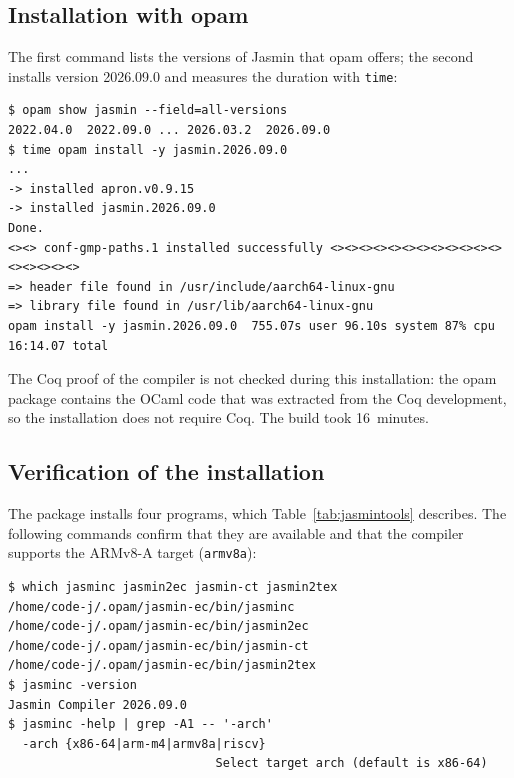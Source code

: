 \documentclass[11pt,a4paper]{article}
\begin{document}
\subsection{Installation with opam}

The first command lists the versions of Jasmin that opam offers; the second
installs version 2026.09.0 and measures the duration with \texttt{time}:

\begin{lstlisting}[style=shell]
$ opam show jasmin --field=all-versions
2022.04.0  2022.09.0 ... 2026.03.2  2026.09.0
$ time opam install -y jasmin.2026.09.0
...
-> installed apron.v0.9.15
-> installed jasmin.2026.09.0
Done.
<><> conf-gmp-paths.1 installed successfully <><><><><><><><><><><><><><><><><>
=> header file found in /usr/include/aarch64-linux-gnu
=> library file found in /usr/lib/aarch64-linux-gnu
opam install -y jasmin.2026.09.0  755.07s user 96.10s system 87% cpu 16:14.07 total
\end{lstlisting}

The Coq proof of the compiler is not checked during this installation: the
opam package contains the OCaml code that was extracted from the Coq
development, so the installation does not require Coq. The build took
16~minutes.

\subsection{Verification of the installation}

The package installs four programs, which Table~\ref{tab:jasmintools}
describes. The following commands confirm that they are available and that
the compiler supports the ARMv8-A target (\texttt{armv8a}):

\begin{lstlisting}[style=shell]
$ which jasminc jasmin2ec jasmin-ct jasmin2tex
/home/code-j/.opam/jasmin-ec/bin/jasminc
/home/code-j/.opam/jasmin-ec/bin/jasmin2ec
/home/code-j/.opam/jasmin-ec/bin/jasmin-ct
/home/code-j/.opam/jasmin-ec/bin/jasmin2tex
$ jasminc -version
Jasmin Compiler 2026.09.0
$ jasminc -help | grep -A1 -- '-arch'
  -arch {x86-64|arm-m4|armv8a|riscv}
                             Select target arch (default is x86-64)
\end{lstlisting}
\end{document}
